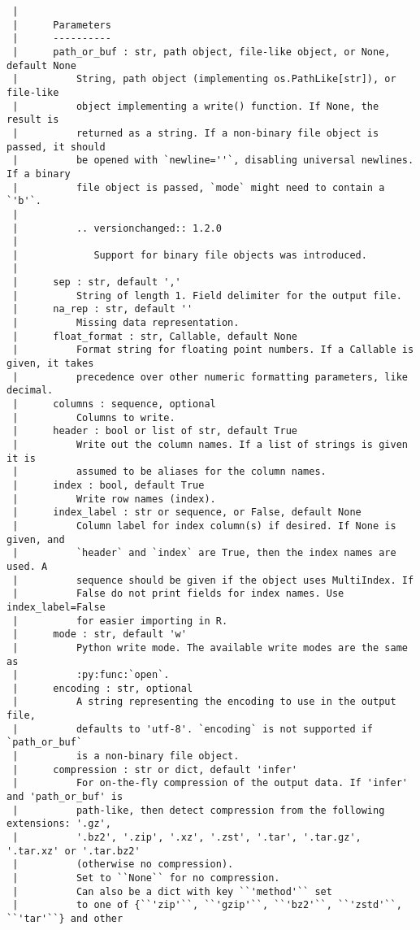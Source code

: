 \documentclass[
  letterpaper,
  DIV=11,
  numbers=noendperiod]{scrreprt}
\begin{document}
\begin{verbatim}
 |      
 |      Parameters
 |      ----------
 |      path_or_buf : str, path object, file-like object, or None, default None
 |          String, path object (implementing os.PathLike[str]), or file-like
 |          object implementing a write() function. If None, the result is
 |          returned as a string. If a non-binary file object is passed, it should
 |          be opened with `newline=''`, disabling universal newlines. If a binary
 |          file object is passed, `mode` might need to contain a `'b'`.
 |      
 |          .. versionchanged:: 1.2.0
 |      
 |             Support for binary file objects was introduced.
 |      
 |      sep : str, default ','
 |          String of length 1. Field delimiter for the output file.
 |      na_rep : str, default ''
 |          Missing data representation.
 |      float_format : str, Callable, default None
 |          Format string for floating point numbers. If a Callable is given, it takes
 |          precedence over other numeric formatting parameters, like decimal.
 |      columns : sequence, optional
 |          Columns to write.
 |      header : bool or list of str, default True
 |          Write out the column names. If a list of strings is given it is
 |          assumed to be aliases for the column names.
 |      index : bool, default True
 |          Write row names (index).
 |      index_label : str or sequence, or False, default None
 |          Column label for index column(s) if desired. If None is given, and
 |          `header` and `index` are True, then the index names are used. A
 |          sequence should be given if the object uses MultiIndex. If
 |          False do not print fields for index names. Use index_label=False
 |          for easier importing in R.
 |      mode : str, default 'w'
 |          Python write mode. The available write modes are the same as
 |          :py:func:`open`.
 |      encoding : str, optional
 |          A string representing the encoding to use in the output file,
 |          defaults to 'utf-8'. `encoding` is not supported if `path_or_buf`
 |          is a non-binary file object.
 |      compression : str or dict, default 'infer'
 |          For on-the-fly compression of the output data. If 'infer' and 'path_or_buf' is
 |          path-like, then detect compression from the following extensions: '.gz',
 |          '.bz2', '.zip', '.xz', '.zst', '.tar', '.tar.gz', '.tar.xz' or '.tar.bz2'
 |          (otherwise no compression).
 |          Set to ``None`` for no compression.
 |          Can also be a dict with key ``'method'`` set
 |          to one of {``'zip'``, ``'gzip'``, ``'bz2'``, ``'zstd'``, ``'tar'``} and other

\end{verbatim}
\end{document}
